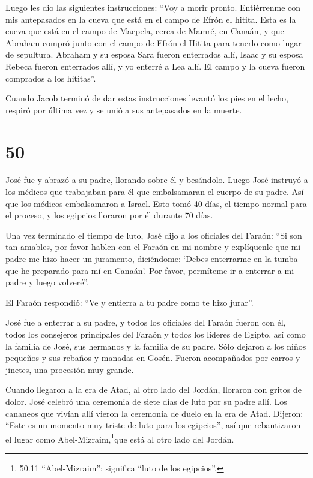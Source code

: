  Luego les dio las siguientes instrucciones: ``Voy a morir
pronto. Entiérrenme con mis antepasados en la cueva que está en el campo
de Efrón el hitita.  Esta es la cueva que está en el campo
de Macpela, cerca de Mamré, en Canaán, y que Abraham compró junto con el
campo de Efrón el Hitita para tenerlo como lugar de sepultura.
 Abraham y su esposa Sara fueron enterrados allí, Isaac y
su esposa Rebeca fueron enterrados allí, y yo enterré a Lea allí.
 El campo y la cueva fueron comprados a los hititas''.

 Cuando Jacob terminó de dar estas instrucciones levantó
los pies en el lecho, respiró por última vez y se unió a sus antepasados
en la muerte.

\hypertarget{section-49}{%
\section{50}\label{section-49}}

 José fue y abrazó a su padre, llorando sobre él y
besándolo.  Luego José instruyó a los médicos que trabajaban
para él que embalsamaran el cuerpo de su padre. Así que los médicos
embalsamaron a Israel.  Esto tomó 40 días, el tiempo normal
para el proceso, y los egipcios lloraron por él durante 70 días.

 Una vez terminado el tiempo de luto, José dijo a los
oficiales del Faraón: ``Si son tan amables, por favor hablen con el
Faraón en mi nombre y explíquenle que  mi padre me hizo
hacer un juramento, diciéndome: `Debes enterrarme en la tumba que he
preparado para mí en Canaán'. Por favor, permíteme ir a enterrar a mi
padre y luego volveré''.

 El Faraón respondió: ``Ve y entierra a tu padre como te
hizo jurar''.

 José fue a enterrar a su padre, y todos los oficiales del
Faraón fueron con él, todos los consejeros principales del Faraón y
todos los líderes de Egipto,  así como la familia de José,
sus hermanos y la familia de su padre. Sólo dejaron a los niños pequeños
y sus rebaños y manadas en Gosén.  Fueron acompañados por
carros y jinetes, una procesión muy grande.

 Cuando llegaron a la era de Atad, al otro lado del Jordán,
lloraron con gritos de dolor. José celebró una ceremonia de siete días
de luto por su padre allí.  Los cananeos que vivían allí
vieron la ceremonia de duelo en la era de Atad. Dijeron: ``Este es un
momento muy triste de luto para los egipcios'', así que rebautizaron el
lugar como Abel-Mizraim,\footnote{50.11 ``Abel-Mizraim'': significa
  ``luto de los egipcios''.}que está al otro lado del Jordán.


